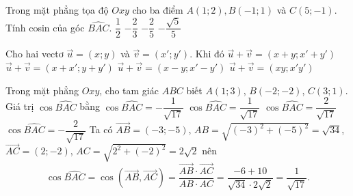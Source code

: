 \begin{ex}%
Trong mặt phẳng tọa độ $Oxy$ cho ba điểm $A(1;2), B(-1;1)$ và $C(5;-1)$. Tính cosin của góc $\widehat{BAC}$.
\choice
{$\dfrac{1}{2}$}
{$-\dfrac{2}{3}$}
{$-\dfrac{2}{5}$}
{\True $-\dfrac{\sqrt{5}}{5}$}
\end{ex}
\begin{ex}
	Cho hai vectơ $\vec{u}=(x;y)$ và $\vec{v}=(x';y')$. Khi đó
	\choice
		{$\vec{u}+\vec{v}=(x+y;x'+y')$}
		{\True $\vec{u}+\vec{v}=(x+x';y+y')$}
		{$\vec{u}+\vec{v}=(x-y;x'-y')$}
		{$\vec{u}+\vec{v}=(xy;x'y')$}
\end{ex}
\begin{ex}%
Trong mặt phẳng $Oxy$, cho tam giác $ABC$ biết $A(1; 3)$, $B(-2;-2)$, $C(3; 1)$. Giá trị $\cos\widehat{BAC}$ bằng
\choice
{$\cos\widehat{BAC}=-\dfrac{1}{\sqrt{17}}$}
{\True $\cos\widehat{BAC}=\dfrac{1}{\sqrt{17}}$}
{$\cos\widehat{BAC}=\dfrac{2}{\sqrt{17}}$}
{$\cos\widehat{BAC}=-\dfrac{2}{\sqrt{17}}$}
\loigiai
{Ta có $\overrightarrow{AB}=(-3;-5)$, $AB=\sqrt{(-3)^2+(-5)^2} = \sqrt{34}$, $\overrightarrow{AC}=(2;-2)$, $AC=\sqrt{2^2+(-2)^2}=2\sqrt{2}$ nên
\[\cos\widehat{BAC}=\cos\left(\overrightarrow{AB},\overrightarrow{AC}\right) = \dfrac{\overrightarrow{AB}\cdot \overrightarrow{AC}}{AB\cdot AC} = \dfrac{-6+10}{\sqrt{34}\cdot 2\sqrt{2}} = \dfrac{1}{\sqrt{17}}.\]}
\end{ex}

